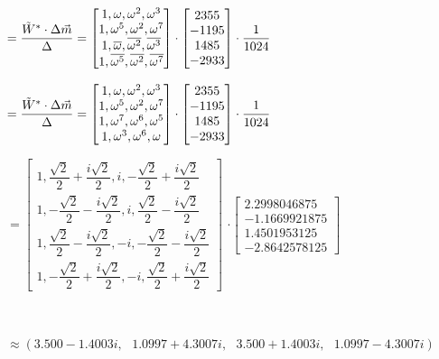 $= \dfrac{\tilde W^* \cdot \Delta \vec{m}}{\Delta} = \begin{bmatrix}
1,\omega,\omega^2, \omega^3\\
1,\omega^5, \omega^{2},\omega^{7}\\
1,\overline{\omega}, \overline{\omega^2}, \overline{\omega^3}\\
1,\overline{\omega^5}, \overline{\omega^{2}}, \overline{\omega^{7}}
\end{bmatrix} \cdot \begin{bmatrix}
2355\\- 1195\\1485\\-2933
\end{bmatrix}\cdot \dfrac{1}{1024}$

$= \dfrac{\tilde W^* \cdot \Delta \vec{m}}{\Delta} = \begin{bmatrix}
1,\omega,\omega^2, \omega^3\\
1,\omega^5, \omega^{2},\omega^{7}\\
1,\omega^7, \omega^6, \omega^5\\
1,\omega^3, \omega^{6}, \omega
\end{bmatrix} \cdot \begin{bmatrix}
2355\\- 1195\\1485\\-2933
\end{bmatrix}\cdot \dfrac{1}{1024}$

$=
\begin{bmatrix}
1,\dfrac{\sqrt{2}}{2} + \dfrac{i\sqrt{2}}{2},i, -\dfrac{\sqrt{2}}{2} + \dfrac{i\sqrt{2}}{2}\\
1,-\dfrac{\sqrt{2}}{2} - \dfrac{i\sqrt{2}}{2}, i,\dfrac{\sqrt{2}}{2} - \dfrac{i\sqrt{2}}{2}\\
1,\dfrac{\sqrt{2}}{2} - \dfrac{i\sqrt{2}}{2}, -i, -\dfrac{\sqrt{2}}{2} - \dfrac{i\sqrt{2}}{2}\\
1,-\dfrac{\sqrt{2}}{2} + \dfrac{i\sqrt{2}}{2}, -i, \dfrac{\sqrt{2}}{2} + \dfrac{i\sqrt{2}}{2}
\end{bmatrix}$
$\cdot \begin{bmatrix}
2.2998046875\\-1.1669921875\\1.4501953125\\-2.8642578125
\end{bmatrix}$

$ $

$ \approx (3.500 - 1.4003i, \text{ } 1.0997 + 4.3007i,\text{ } 3.500 + 1.4003i, \text{ } 1.0997 - 4.3007i)$

